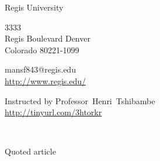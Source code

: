 \documentclass[11pt,a4paper]{scrartcl} %
\begin{document}
\pagecolor{Gray!10}
\begin{cv}{}
        \begin{cvlist}{\textcolor{PineGreen}{}}\label{PersDat}  
            \item   Regis University
            \item   3333\\
                    Regis Boulevard Denver \\	
                    Colorado 80221-1099
            \item   mansf843@regis.edu\\				
                    \url{http://www.regis.edu/}				
        \end{cvlist}
        \begin{cvlist}{}\label{irgendwas}
            \item Instructed by Professor~Henri~Tshibambe\\
             \url{http://tinyurl.com/3htorkr}
        \end{cvlist}
    \end{cv}
\clearpage

\noindent
\textcolor{OliveGreen}{}\\
\textcolor{PineGreen}{}
\begin{verse}

\end{verse}
\textcolor{PineGreen}{Quoted article}~\cite{key here}
\clearpage
\title{\textcolor{OliveGreen}{\rmfamily\normalfont{}}}
    \author{\textcolor{PineGreen}{}}
    \date{} %
    
    \maketitle
    
    \begin{abstract}
  
    \end{abstract}
       
    \tableofcontents
    
    \section{}

    \nocite{*}
    
    
\end{document}
